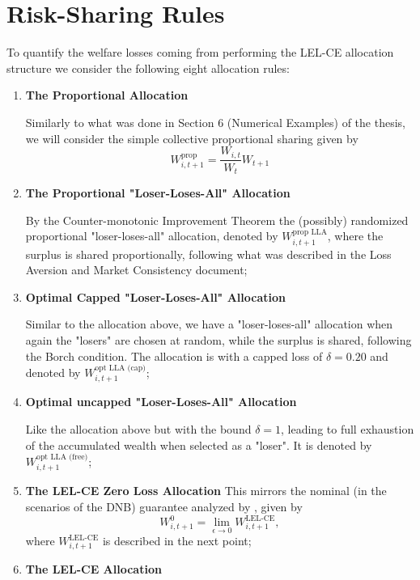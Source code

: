 \section{Risk-Sharing Rules}
\label{Sect:Risk-Sharing_Rules}
To quantify the welfare losses coming from performing the LEL-CE allocation structure we consider the following eight allocation rules:
\begin{enumerate}
    \item \textbf{The Proportional Allocation}
    
    Similarly to what was done in Section 6 (Numerical Examples) of the thesis, we will consider the simple collective proportional sharing given by
    \begin{equation*}
        W_{i,t+1}^{\text{prop}} = \frac{W_{i,t}}{W_t} W_{t+1}
    \end{equation*}

    \item \textbf{The Proportional "Loser-Loses-All" Allocation} 
    
    By the Counter-monotonic Improvement Theorem the (possibly) randomized proportional "loser-loses-all" allocation, denoted by $W_{i,t+1}^{\text{prop LLA}}$, where the surplus is shared proportionally, following what was described in the Loss Aversion and Market Consistency document;
    \item \textbf{Optimal Capped "Loser-Loses-All" Allocation}
    
    Similar to the allocation above, we have a "loser-loses-all" allocation when again the "losers" are chosen at random, while the surplus is shared, following the Borch condition. The allocation is with a capped loss of $\delta = 0.20$ and denoted by $W_{i,t+1}^{\text{opt LLA (cap)}}$;

    \item \textbf{Optimal uncapped "Loser-Loses-All" Allocation}
    
    Like the allocation above but with the bound $\delta = 1$, leading to full exhaustion of the accumulated wealth when selected as a "loser". It is denoted by $W_{i,t+1}^{\text{opt LLA (free)}}$;
    \item \textbf{The LEL-CE Zero Loss Allocation}
    This mirrors the nominal (in the scenarios of the DNB) guarantee analyzed by \citet{KokkenNijmanWerker2024}, given by
    \begin{equation*}
        W_{i,t+1}^0 = \lim_{\epsilon \to 0} W_{i,t+1}^{\text{LEL-CE}},
    \end{equation*}
    where $W_{i,t+1}^{\text{LEL-CE}}$ is described in the next point;
    \item \textbf{The LEL-CE Allocation}
    

\end{enumerate}
